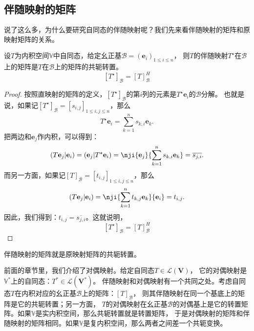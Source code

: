 \documentclass[12pt,UTF8]{ctexbook}
\begin{document}
\subsection{伴随映射的矩阵}
说了这么多，为什么要研究自同态的伴随映射呢？我们先来看伴随映射的矩阵和原映射矩阵的关系。
\begin{pp}\label{pp:8_5}
    设$T$为内积空间$\mathbb{V}$中自同态，给定幺正基$\mathcal{B} = (\mathbf{e}_i)_{1 \leqslant i \leqslant n}$，
    则$T$的伴随映射$T^\star$在$\mathcal{B}$上的矩阵是$T$在$\mathcal{B}$上的矩阵的共轭转置。
    $$ [T^\star]_\mathcal{B} = [T]_\mathcal{B}^H $$
\end{pp}
\begin{proof} %
    按照直映射的矩阵的定义，$[T^\star]_\mathcal{B}$的第$i$列的元素是$T^\star \mathbf{e}_i$的$\mathcal{B}$分解。
    也就是说，如果记$[T^\star]_\mathcal{B} = [s_{i,j}]_{1 \leqslant i, j \leqslant n}$，那么
    $$ T^\star \mathbf{e}_i = \sum_{k=1}^n s_{k,i} \mathbf{e}_k. $$
    把两边和$\mathbf{e}_j$作内积，可以得到：
    $$ (T\mathbf{e}_j | \mathbf{e}_i) = (\mathbf{e}_j | T^\star \mathbf{e}_i) =\nji{ \mathbf{e}_j }{ \sum_{k=1}^n s_{k,i} \mathbf{e}_k } = \overline{s_{j,i}}.$$
    而另一方面，如果记$[T]_\mathcal{B} = [t_{i,j}]_{1 \leqslant i, j \leqslant n}$，那么
    $$ (T\mathbf{e}_j | \mathbf{e}_i) = \nji{ \sum_{k=1}^n t_{k,j} \mathbf{e}_k }{ \mathbf{e}_i } = t_{i,j}. $$
    因此，我们得到：$t_{i,j} = \overline{s_{j,i}}$。这就说明，
    $$ [T^\star]_\mathcal{B} = [T]_\mathcal{B}^H $$
\end{proof}

伴随映射的矩阵就是原映射矩阵的共轭转置。

前面的章节里，我们介绍了对偶映射。给定自同态$T\in\mathcal{L}(\mathbf{V})$，
它的对偶映射是$\mathbb{V}^*$上的自同态：$T^* \in \mathcal{L}(\mathbf{V}^*)$。
伴随映射和对偶映射有一个共同之处。考虑自同态$T$在内积对应的幺正基$\mathcal{B}$上的矩阵：$[T]_\mathcal{B}$，
则其伴随映射在同一个基底上的矩阵是它的共轭转置；另一方面，
$T$的对偶映射在幺正基$\mathcal{B}$的对偶基上是它的转置矩阵。如果$\mathbb{V}$是实内积空间，那么共轭转置就是转置矩阵，
于是对偶映射的矩阵和伴随映射的矩阵相同。如果$\mathbb{V}$是复内积空间，那么两者之间差一个共轭变换。
\end{document}

